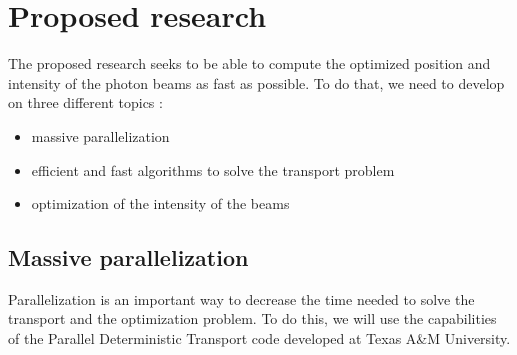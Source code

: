 \section{Proposed research}
The proposed research seeks to be able to compute the optimized position
and intensity of the photon beams as fast as possible. To do that, we need to
develop on three different topics :
\begin{itemize}
\item massive parallelization
\item efficient and fast algorithms to solve the transport problem
\item optimization of the intensity of the beams 
\end{itemize}

\subsection{Massive parallelization}
Parallelization is an important way to decrease the time needed to solve the
transport and the optimization problem. To do this, we will use
the capabilities of the Parallel Deterministic Transport code developed at
Texas A\&M University. 

